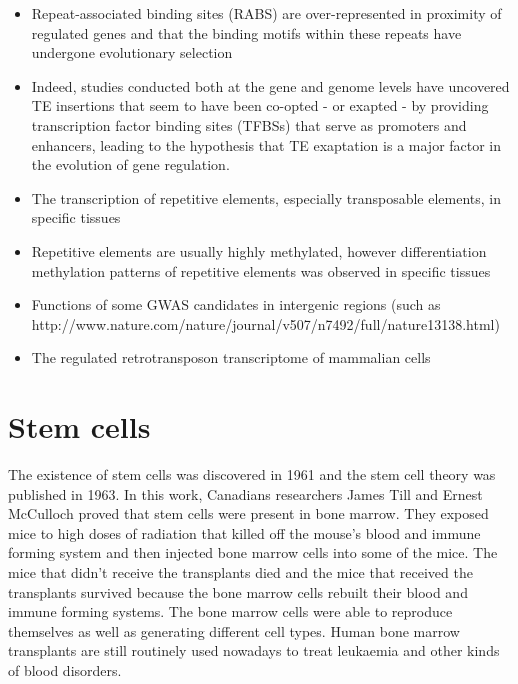 \begin{itemize}
   \item Repeat-associated binding sites (RABS) are over-represented in proximity of regulated genes and that the binding motifs within these repeats have undergone evolutionary selection
   \item Indeed, studies conducted both at the gene and genome levels have uncovered TE insertions that seem to have been co-opted - or exapted - by providing transcription factor binding sites (TFBSs) that serve as promoters and enhancers, leading to the hypothesis that TE exaptation is a major factor in the evolution of gene regulation.
   \item The transcription of repetitive elements, especially transposable elements, in specific tissues
   \item Repetitive elements are usually highly methylated, however differentiation methylation patterns of repetitive elements was observed in specific tissues
   \item Functions of some GWAS candidates in intergenic regions (such as http://www.nature.com/nature/journal/v507/n7492/full/nature13138.html)
   \item The regulated retrotransposon transcriptome of mammalian cells\cite{pmid19377475}
\end{itemize}


\section{Stem cells}

The existence of stem cells was discovered in 1961 and the stem cell theory was published in 1963\cite{pmid13970094}. In this work, Canadians researchers James Till and Ernest McCulloch proved that stem cells were present in bone marrow. They exposed mice to high doses of radiation that killed off the mouse's blood and immune forming system and then injected bone marrow cells into some of the mice. The mice that didn't receive the transplants died and the mice that received the transplants survived because the bone marrow cells rebuilt their blood and immune forming systems. The bone marrow cells were able to reproduce themselves as well as generating different cell types. Human bone marrow transplants are still routinely used nowadays to treat leukaemia and other kinds of blood disorders.

